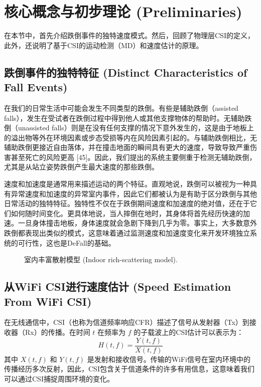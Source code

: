 \documentclass[journal]{IEEEtran}
\begin{document}
\section{核心概念与初步理论 (Preliminaries)}
在本节中，首先介绍跌倒事件的独特速度模式。然后，回顾了物理层CSI的定义，此外，还说明了基于CSI的运动检测（MD）和速度估计的原理。

\subsection{跌倒事件的独特特征 (Distinct Characteristics of Fall Events)}
在我们的日常生活中可能会发生不同类型的跌倒。有些是辅助跌倒（assisted falls），发生在受试者在跌倒过程中得到他人或其他支撑物体的帮助时。无辅助跌倒（unassisted falls）则是在没有任何支撑的情况下意外发生的，这是由于地板上的溢出物等外在环境因素或步态受损等内在风险因素引起的。与辅助跌倒相比，无辅助跌倒更接近自由落体，并在撞击地面的瞬间具有更大的速度，导致导致严重伤害甚至死亡的风险更高 [45]。因此，我们提出的系统主要侧重于检测无辅助跌倒，尤其是从站立姿势跌倒产生最大速度的那些跌倒。

速度和加速度是通常用来描述运动的两个特征。直观地说，跌倒可以被视为一种具有异常速度和加速度的异常室内事件，因此它们都被认为是有助于区分跌倒与其他日常活动的独特特征。独特性不仅在于跌倒期间速度和加速度的绝对值，还在于它们如何随时间变化。更具体地说，当人摔倒在地时，其身体将首先经历快速的加速。一旦身体撞击地板，身体速度就会急剧下降到几乎为零。事实上，大多数意外跌倒都表现出类似的模式，这意味着通过监测速度和加速度变化来开发环境独立系统的可行性，这也是DeFall的基础。

\begin{figure}[htbp]
\centering
\vspace{4cm} %
\caption{室内丰富散射模型 (Indoor rich-scattering model).}
\end{figure}

\subsection{从WiFi CSI进行速度估计 (Speed Estimation From WiFi CSI)}
在无线通信中，CSI（也称为信道频率响应CFR）描述了信号从发射器（Tx）到接收器（Rx）的传播。在时间 $t$ 在频率为 $f$ 的子载波上的CSI估计可以表示为：
\begin{equation}
H(t, f) = \frac{Y(t, f)}{X(t, f)}
\end{equation}
其中 $X(t, f)$ 和 $Y(t, f)$ 是发射和接收信号。传输的WiFi信号在室内环境中的传播经历多次反射，因此，CSI包含关于信道条件的许多有用信息，这意味着我们可以通过CSI捕捉周围环境的变化。
\end{document}
